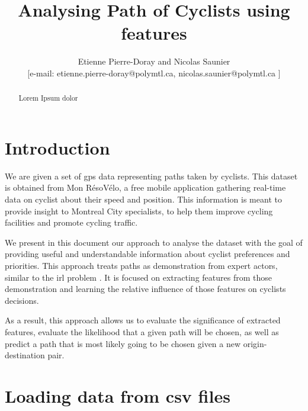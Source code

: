 \documentclass{article}
\begin{document}
\title{Analysing Path of Cyclists using features}
\author{Etienne Pierre-Doray and Nicolas Saunier%
\\
{\normalsize [e-mail: etienne.pierre-doray@polymtl.ca,  nicolas.saunier@polymtl.ca ]}%
}

\maketitle
\thispagestyle{empty}

\begin{abstract}
Lorem Ipsum dolor
\end{abstract}

\section{Introduction}\label{Sec:Intro}

We are given a set of \gls{gps} data representing paths taken by 
cyclists. This dataset is obtained from Mon RésoVélo, a free mobile application
gathering real-time data on cyclist about their speed and position. This information is meant to provide insight to Montreal City specialists, to help them improve cycling facilities and promote cycling traffic.

We present in this document our approach to analyse the dataset with the goal of
providing useful and understandable information about cyclist preferences and priorities. This approach treats paths as demonstration from expert actors, similar to the \gls{irl} problem \cite{ziebart2008maximum}. It is focused on extracting features from those demonstration 
and learning the relative influence of those features on cyclists decisions.  

As a result, this approach allows us to evaluate the significance of extracted features, evaluate the likelihood that a given path will be chosen, as well as predict a path that is most likely going to be chosen given a new origin-destination pair.


\section{Loading data from csv files}\label{Sec:Load}
\end{document}
